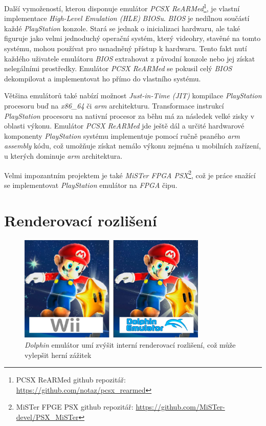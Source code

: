 Další vymožeností, kterou disponuje emulátor \textit{PCSX ReARMed}\footnote{PCSX ReARMed github repozitář: \url{https://github.com/notaz/pcsx_rearmed}}, 
je vlastní implementace \textit{High-Level Emulation (HLE)} \textit{BIOSu}. 
\textit{BIOS} je nedílnou součástí každé \textit{PlayStation} konzole. Stará se jednak o inicializaci hardwaru, 
ale také figuruje jako velmi jednoduchý operační systém, který videohry, stavěné na tomto systému, 
mohou používat pro usnadněný přístup k hardwaru. Tento fakt nutí každého uživatele emulátoru 
\textit{BIOS} extrahovat z původní konzole nebo jej získat nelegálními prostředky. 
Emulátor \textit{PCSX ReARMed} se pokusil celý \textit{BIOS} dekompilovat a implementovat ho přímo do vlastního systému.

Většina emulátorů také nabízí možnost \textit{Just-in-Time (JIT)} kompilace \textit{PlayStation} 
procesoru buď na \textit{x86\_64} či \textit{arm} architekturu. Transformace instrukcí \textit{PlayStation} 
procesoru na nativní procesor za běhu má za následek velké zisky v oblasti výkonu. Emulátor \textit{PCSX ReARMed} 
jde ještě dál a určité hardwarové komponenty \textit{PlayStation} systému implementuje pomocí ručně 
psaného \textit{arm assembly} kódu, což umožňuje získat nemálo výkonu zejména u mobilních zařízení, u kterých dominuje \textit{arm} architektura.

Velmi impozantním projektem je také \textit{MiSTer FPGA PSX}\footnote{MiSTer FPGE PSX github repozitář: \url{https://github.com/MiSTer-devel/PSX_MiSTer}}, 
což je práce snažící se implementovat \textit{PlayStation} emulátor na \textit{FPGA} čipu.

\section{Renderovací rozlišení}

\begin{figure}[hbt]
    \centering
    \includegraphics[width=0.8\textwidth]{obrazky-figures/dolphin-resolution.jpg}
    \caption[Příklad zvýšení rozlišení]{\textit{Dolphin} emulátor umí zvýšit interní renderovací rozlišení, což může vylepšit herní zážitek}
    \label{dolphin-resolution}
\end{figure}

